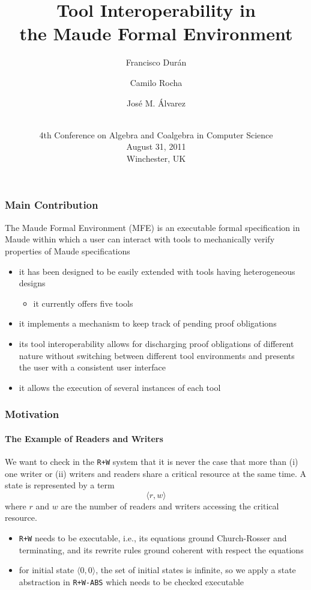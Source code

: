 \documentclass{beamer}
\title[Tool Interoperability in MFE]{
  Tool Interoperability in \\ the Maude Formal Environment
}
\author[Dur\'an, Rocha, \'Alvarez]{
  Francisco Dur\'an\inst{1} \and Camilo Rocha\inst{2} \and Jos\'{e} M. \'Alvarez\inst{1}
}
\institute[UMA, U of I]{
  \inst{1}Universidad de M\'alaga \\
  \inst{2}University of Illinois at Urbana-Champaign
}
\date[Calco-Tools 2011]{
  \\
  4th Conference on Algebra and Coalgebra in Computer Science \\
  August 31, 2011 \\
  Winchester, UK
}
\begin{document}
\begin{frame}
  \titlepage
\end{frame}

\begin{frame}
  \frametitle{Main Contribution}

  The Maude Formal Environment (MFE) is an executable formal specification in Maude
  within which a user can interact with tools to mechanically verify properties
  of Maude specifications

  \begin{itemize}
    \item<2-> it has been designed to be easily extended with tools having
      heterogeneous designs

    \begin{itemize}
      \item<2-> it currently offers five tools
    \end{itemize}

    \item<3-> it implements a mechanism to keep track of pending proof
      obligations

    \item<4-> its tool interoperability allows for discharging proof obligations of
      different nature without switching between different tool environments
      and presents the user with a consistent user interface

    \item<5-> it allows the execution of several instances of each tool

  \end{itemize}
\end{frame}


\begin{frame}
  \frametitle{Motivation}
  \framesubtitle{The Example of Readers and Writers}

  We want to check in the {\tt R+W} system that it is never the case that
  more than (i) one writer or (ii) writers and readers share a critical 
  resource at the same time. A state is represented by a term
  \[\langle r,w\rangle\]
  where $r$ and $w$ are the number of readers and writers accessing the critical resource.

  \begin{itemize}
    \item<2-> {\tt R+W} needs to be executable, i.e., its equations ground
      Church-Rosser and terminating, and its rewrite rules ground coherent
      with respect the equations
    \item<3-> for initial state $\langle 0,0\rangle$, the set of initial states
      is infinite, so we apply a state abstraction in {\tt R+W-ABS} which
      needs to be checked executable
  \end{itemize}
\end{frame}
\end{document}
